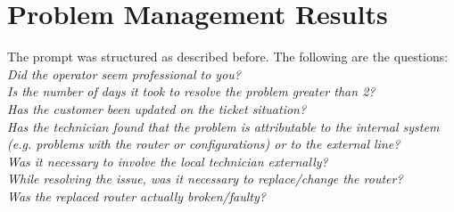 \newpage
\section{Problem Management Results}
\label{sec:probmanageres}
The prompt was structured as described before. The following are the questions:\\

\textit{Did the operator seem professional to you?                                                                                                          \\
      Is the number of days it took to resolve the problem greater than 2?                                                                                        \\
      Has the customer been updated on the ticket situation?                                                                                                      \\
      Has the technician found that the problem is attributable to the internal system (e.g. problems with the router or configurations) or to the external line? \\
      Was it necessary to involve the local technician externally?                                                                                                \\
      While resolving the issue, was it necessary to replace/change the router?                                                                                   \\
      Was the replaced router actually broken/faulty?}\\

